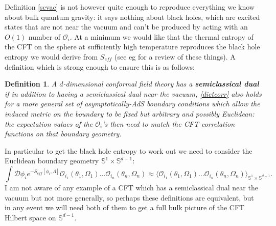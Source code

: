 \documentclass[toc]{PoS}
\newcommand{\be}{\begin{equation}}
\newcommand{\ee}{\end{equation}}
\newcommand{\lan}{\langle}
\newcommand{\ran}{\rangle}
\newcommand{\mO}{\mathcal{O}}
\newtheorem{mydef}{Definition}[section]
\begin{document}
Definition \eqref{scvac} is not however quite enough to reproduce everything we know about bulk quantum gravity: it says nothing about black holes, which are excited states that are not near the vacuum and can't be produced by acting with an $O(1)$ number of $\mO_i$.  At a minimum we would like that the thermal entropy of the CFT on the sphere at sufficiently high temperature reproduces the black hole entropy we would derive from $S_{eff}$ (see eg \cite{Harlow:2014yka} for a review of these things).  A definition which is strong enough to ensure this is as follows:
\begin{mydef}\label{fulldef}
A $d$-dimensional conformal field theory has a \textbf{semiclassical dual} if in addition to having a semiclassical dual near the vacuum, \eqref{dictcorr} also holds for a more general set of asymptotically-AdS boundary conditions which allow the induced metric on the boundary to be fixed but arbitrary and possibly Euclidean: the expectation values of the $\mO_i$'s then need to match the CFT correlation functions on that boundary geometry.
\end{mydef}
In particular to get the black hole entropy to work out we need to consider the Euclidean boundary geometry $\mathbb{S}^1\times \mathbb{S}^{d-1}$:
\be
\int \mathcal{D}\phi_i e^{-S_{eff}[\phi_i,\Lambda]}\mO_{i_1}(\theta_1,\Omega_1)\ldots \mO_{i_n}(\theta_n,\Omega_n)\approx \lan \mO_{i_1}(\theta_1,\Omega_1)\ldots \mO_{i_n}(\theta_n,\Omega_n)\ran_{\mathbb{S}^1\times \mathbb{S}^{d-1}}.
\ee   
I am not aware of any example of a CFT which has a semiclassical dual near the vacuum but not more generally, so perhaps these definitions are equivalent, but in any event we will need both of them to get a full bulk picture of the CFT Hilbert space on $\mathbb{S}^{d-1}$.
\end{document}
